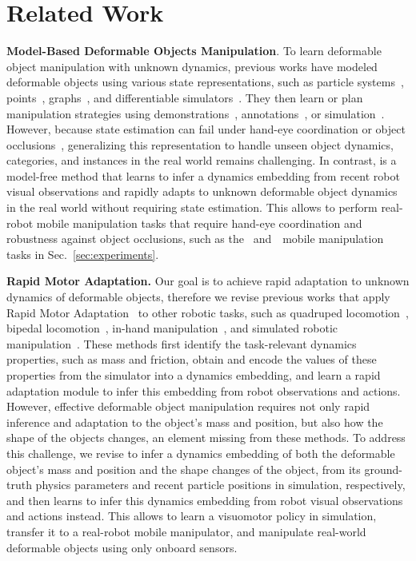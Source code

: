 \section{Related Work}
\label{s_rw}
\textbf{Model-Based Deformable Objects Manipulation}. To learn deformable object manipulation with unknown dynamics, previous works have modeled deformable objects using various state representations, such as particle systems~\cite{jaillet1998deformable,li2018learning,liu2023robotic}, points~\cite{sun2014heuristic,weng2022fabricflownet,yuba2017unfolding,jangir2020dynamic}, graphs~\cite{triantafyllou2016geometric,yuba2017unfolding,longhini2023edo,lippi2020latent}, and differentiable simulators~\cite{li2018learning,chen2024differentiable,heiden2021disect,schenck2018spnets,xian2023fluidlab}. They then learn or plan manipulation strategies using demonstrations~\cite{chen2024differentiable,balaguer2011combining}, annotations~\cite{chi2024iterative}, or simulation~\cite{li2018learning,lin2022learning}. However, because state estimation can fail under hand-eye coordination or object occlusions~\cite{chen2024differentiable}, generalizing this representation to handle unseen object dynamics, categories, and instances in the real world remains challenging. In contrast, \methodname{} is a model-free method that learns to infer a dynamics embedding from recent robot visual observations and rapidly adapts to unknown deformable object dynamics in the real world without requiring state estimation. This allows \methodname{} to perform real-robot mobile manipulation tasks that require hand-eye coordination and robustness against object occlusions, such as the \taskone~and~\tasktwo~mobile manipulation tasks in Sec.~\ref{sec:experiments}.

\textbf{Rapid Motor Adaptation.} Our goal is to achieve rapid adaptation to unknown dynamics of deformable objects, therefore we revise previous works that apply Rapid Motor Adaptation~\cite{kumar2021rma} to other robotic tasks, such as quadruped locomotion~\cite{fu2022deep,fu2021coupling,fu2021minimizing,zhuang2023robot}, bipedal locomotion~\cite{kumar2022adapting,lee2020learning}, in-hand manipulation~\cite{qi2023hand}, and simulated robotic manipulation~\cite{liang2024rapid}. These methods first identify the task-relevant dynamics properties, such as mass and friction, obtain and encode the values of these properties from the simulator into a dynamics embedding, and learn a rapid adaptation module to infer this embedding from robot observations and actions. However, effective deformable object manipulation requires not only rapid inference and adaptation to the object's mass and position, but also how the shape of the objects changes, an element missing from these methods. To address this challenge, we revise \methodname{} to infer a dynamics 
embedding of both the deformable object's mass and position and the shape changes of the object, from its ground-truth physics parameters and recent particle positions in simulation, respectively, and then learns to infer this dynamics embedding from robot visual observations and actions instead. This allows \methodname{} to learn a visuomotor policy in simulation, transfer it to a real-robot mobile manipulator, and manipulate real-world deformable objects using only onboard sensors. 

